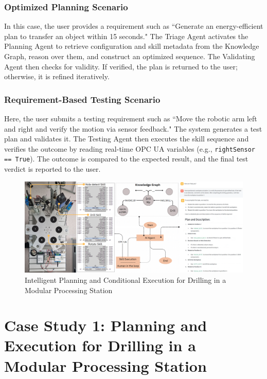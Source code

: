 \documentclass[conference]{IEEEtran}
\begin{document}
\subsubsection{Optimized Planning Scenario}
In this case, the user provides a requirement such as ``Generate an energy-efficient plan to transfer an object within 15 seconds." The Triage Agent activates the Planning Agent to retrieve configuration and skill metadata from the Knowledge Graph, reason over them, and construct an optimized sequence. The Validating Agent then checks for validity. If verified, the plan is returned to the user; otherwise, it is refined iteratively.

\subsubsection{Requirement-Based Testing Scenario}
Here, the user submits a testing requirement such as ``Move the robotic arm left and right and verify the motion via sensor feedback." The system generates a test plan and validates it. The Testing Agent then executes the skill sequence and verifies the outcome by reading real-time OPC UA variables (e.g., \texttt{rightSensor == True}). The outcome is compared to the expected result, and the final test verdict is reported to the user.


\begin{figure}
    \includegraphics[width=1\textwidth]{images/PS_Arch.png}
    \caption{Intelligent Planning and Conditional Execution for Drilling in a Modular Processing Station }
    \label{fig:ps_arch}
\end{figure}




\section{Case Study 1: Planning and Execution for Drilling in a Modular Processing Station}
\end{document}
